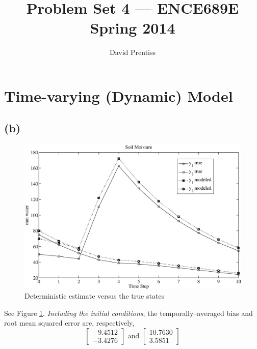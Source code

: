 \documentclass[fleqn, letterpaper]{tufte-handout}
\title{Problem Set 4 --- ENCE689E Spring 2014}
\author{David Prentiss}
\begin{document}
\maketitle

\section{Time-varying (Dynamic) Model}

{\scriptsize
        \begin{minipage}{\linewidth}
                
        \end{minipage}
}
\subsection{(b)}

\begin{figure}
        \includegraphics[width=\textwidth]{ps5figb}
        \caption{Deterministic estimate versus the true states}
        \label{ps5figb}
\end{figure}
See Figure \ref{ps5figb}. \emph{Including the initial conditions}, the temporally--averaged bias and root mean squared error are, respectively,
\[
        \begin{bmatrix}
                -9.4512 \\
                -3.4276
        \end{bmatrix}
        \text{ and }
        \begin{bmatrix}
                10.7630 \\
                3.5851
        \end{bmatrix}
\]
\end{document}
